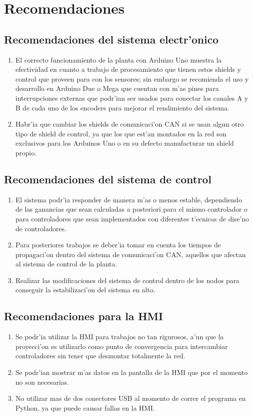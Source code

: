 \section{Recomendaciones}
\subsection{Recomendaciones del sistema electr'onico}
\begin{enumerate}
	\item El correcto funcionamiento de la planta con Arduino Uno muestra la efectividad en cuanto a trabajo de procesamiento que tienen estos shields y control que proveen para con los sensores; sin embargo se recomienda el uso y desarrollo en Arduino Due o Mega que cuentan con m'as pines para interrupciones externas que podr'ian ser usados para conectar los canales A y B de cada uno de los encoders para mejorar el rendimiento del sistema.
	\item Habr'ia que cambiar los shields de comunicaci'on CAN si se usan algun otro tipo de shield de control, ya que los que est'an montados en la red son exclusivos para los Arduinos Uno o en su defecto manufacturar un shield propio.
	
\end{enumerate}
\subsection{Recomendaciones del sistema de control}
\begin{enumerate}
	\item El sistema podr'ia responder de manera m'as o menos estable, dependiendo de las ganancias que sean calculadas a posteriori para el mismo controlador o para controladores que sean implementados con diferentes t'ecnicas de dise'no de controladores.
	\item Para posteriores trabajos se deber'ia tomar en cuenta los tiempos de propagaci'on dentro del sistema de comunicaci'on CAN, aquellos que afectan al sistema de control de la planta.
	\item Realizar las modificaciones del sistema de control dentro de los nodos para conseguir la estabilizaci'on del sistema en alto.
\end{enumerate}
\subsection{Recomendaciones para la HMI}
\begin{enumerate}
	\item Se podr'ia utilizar la HMI para trabajos no tan rigurosos, a'un que la proyecci'on es utilizarlo como punto de convergencia para intercambiar controladores sin tener que desmontar totalmente la red.
	\item Se podr'ian mostrar m'as datos en la pantalla de la HMI que por el momento no son necesarias.
	\item No utilizar mas de dos conectores USB al momento de correr el programa en Python, ya que puede causar fallas en la HMI.
	
\end{enumerate}
